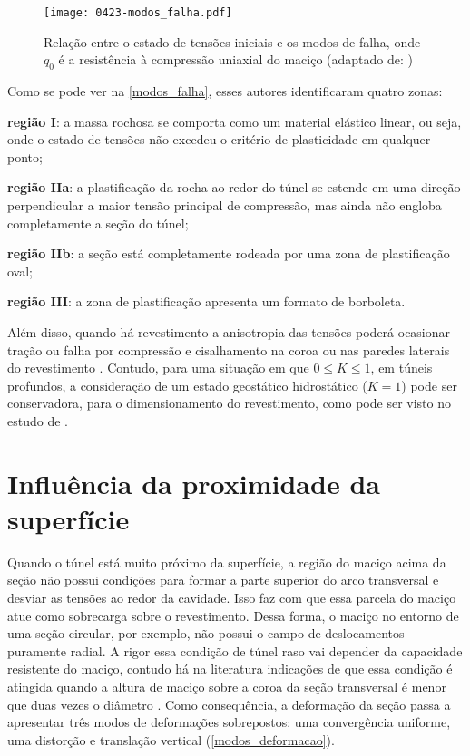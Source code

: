 \begin{figure}[H]
	\begin{center}
		\texttt{[image: 0423-modos\_falha.pdf]}
	\end{center}
	\caption{\label{modos_falha}Relação entre o estado de tensões iniciais e os modos de falha, onde $q_0$ é a resistência à compressão uniaxial do maciço (adaptado de: )}
\end{figure}

Como se pode ver na \autoref{modos_falha}, esses autores identificaram quatro zonas:

\begin{alineas}
	\item \textbf{região I}: a massa rochosa se comporta como um material elástico linear, ou seja, onde o estado de tensões não excedeu o critério de plasticidade em qualquer ponto;
	\item \textbf{região IIa}: a plastificação da rocha ao redor do túnel se estende em uma direção perpendicular a maior tensão principal de compressão, mas ainda não engloba completamente a seção do túnel;
	\item \textbf{região IIb}: a seção está completamente rodeada por uma zona de plastificação oval;
	\item \textbf{região III}: a zona de plastificação apresenta um formato de borboleta.
\end{alineas}

Além disso, quando há revestimento a anisotropia das tensões poderá ocasionar tração ou falha por compressão e cisalhamento na coroa ou nas paredes laterais do revestimento \cite{Brady2006}. Contudo, para uma situação em que $0 \leq K \leq 1$, em túneis profundos, a consideração de um estado geostático hidrostático ($K=1$) pode ser conservadora, para o dimensionamento do revestimento, como pode ser visto no estudo de .


\section{Influência da proximidade da superfície}

Quando o túnel está muito próximo da superfície, a região do maciço acima da seção não possui condições para formar a parte superior do arco transversal e desviar as tensões ao redor da cavidade. Isso faz com que essa parcela do maciço atue como sobrecarga sobre o revestimento. Dessa forma, o maciço no entorno de uma seção circular, por exemplo, não possui o campo de deslocamentos puramente radial. A rigor essa condição de túnel raso vai depender da capacidade resistente do maciço, contudo há na literatura indicações de que essa condição é atingida quando a altura de maciço sobre a coroa da seção transversal é menor que duas vezes o diâmetro \cite[p. 67]{Chapman2018}. Como consequência, a deformação da seção passa a apresentar três modos de deformações sobrepostos: uma convergência uniforme, uma distorção e translação vertical (\autoref{modos_deformacao}).

